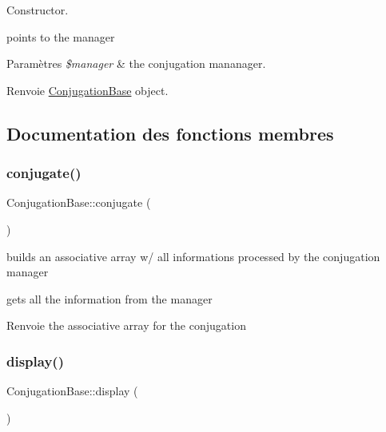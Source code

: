 Constructor. 

points to the manager


\begin{DoxyParams}{Paramètres}
{\em \$manager} & the conjugation mananager. \\
\hline
\end{DoxyParams}
\begin{DoxyReturn}{Renvoie}
\hyperlink{class_conjugation_base}{Conjugation\+Base} object. 
\end{DoxyReturn}


\subsection{Documentation des fonctions membres}
\hypertarget{class_conjugation_base_a8137cfd9e8f57dafedd5cc724d57b9e6}{}\label{class_conjugation_base_a8137cfd9e8f57dafedd5cc724d57b9e6} 
\subsubsection{\texorpdfstring{conjugate()}{conjugate()}}
{\footnotesize\ttfamily Conjugation\+Base\+::conjugate (\begin{DoxyParamCaption}{ }\end{DoxyParamCaption})}



builds an associative array w/ all informations processed by the conjugation manager 

gets all the information from the manager

\begin{DoxyReturn}{Renvoie}
the associative array for the conjugation 
\end{DoxyReturn}
\hypertarget{class_conjugation_base_a7a50c953a3f949a7740d3fb51c4b929d}{}\label{class_conjugation_base_a7a50c953a3f949a7740d3fb51c4b929d} 
\subsubsection{\texorpdfstring{display()}{display()}}
{\footnotesize\ttfamily Conjugation\+Base\+::display (\begin{DoxyParamCaption}{ }\end{DoxyParamCaption})\hspace{0.3cm}{\ttfamily [abstract]}}


